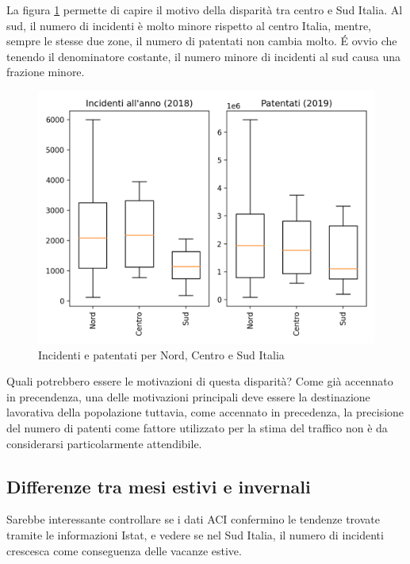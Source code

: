 \documentclass[a4paper,12pt]{report}
\begin{document}
La figura \ref{fig:incidenti-patentati-box} permette di capire il motivo della disparità 
tra centro e Sud Italia.
Al sud, il numero di incidenti è molto minore rispetto al centro Italia, mentre, 
sempre le stesse due zone, il numero di patentati non cambia molto. 
\'E ovvio che tenendo il denominatore costante, il numero minore di incidenti al 
sud causa una frazione minore.

\begin{figure}
    \hfill\includegraphics[width=0.7\linewidth]{../src/incidenti/incidenti_aci/mappe_regioni/incidenti_patenti_box.png}\hspace*{\fill}
    \caption{Incidenti e patentati per Nord, Centro e Sud Italia}
    \label{fig:incidenti-patentati-box}
\end{figure}

Quali potrebbero essere le motivazioni di questa disparità?
Come già accennato in precendenza, una delle motivazioni principali 
deve essere la destinazione lavorativa della popolazione tuttavia, 
come accennato in precedenza, 
la precisione del numero di patenti come fattore utilizzato per la stima 
del traffico non è da considerarsi particolarmente attendibile.

\subsection{Differenze tra mesi estivi e invernali}

Sarebbe interessante controllare se i dati ACI confermino le tendenze trovate tramite 
le informazioni Istat, e vedere se nel Sud Italia, il numero di incidenti crescesca 
come conseguenza delle vacanze estive.
\end{document}
